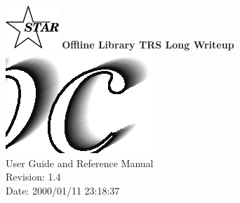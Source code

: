 \documentclass[twoside]{article}
\begin{document}
%
%
\begin{titlepage}
\pagestyle{empty}
\vspace*{-35mm}
\begin{center}
  \mbox{\includegraphics[width=2cm]{StarIcon.eps}}
  {\Large\bf Offline Library TRS Long Writeup}
  \hfill\mbox{}\\[3cm]
  \mbox{\includegraphics[width=\textwidth]{trsTitle.eps}}
  \hfill\mbox{}\\[3cm]
  {\LARGE User Guide and Reference Manual}\\[2cm]
  {\LARGE $ $Revision: 1.4 $ $}  \\[5mm] %
  {\LARGE $ $Date: 2000/01/11 23:18:37 $ $}  %
  \vfill
\end{center}
\cleardoublepage
\end{titlepage}

%
%
\tableofcontents
\cleardoublepage

%
%
\end{document}
